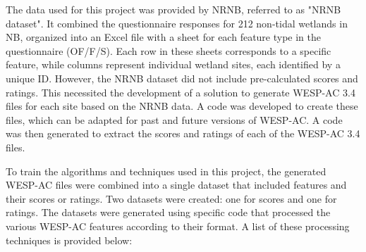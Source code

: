\documentclass[12pt,letterpaper]{article}
\begin{document}
The data used for this project was provided by \ac{NRNB}, referred to as "NRNB dataset".
It combined the questionnaire responses for 212 non-tidal wetlands in \ac{NB}, organized into an Excel file with a sheet for each feature type in the questionnaire (OF/F/S).
Each row in these sheets corresponds to a specific feature, while columns represent individual wetland sites, each identified by a unique ID.
However, the NRNB dataset did not include pre-calculated scores and ratings.
This necessited the development of a solution to generate \ac{WESP-AC} 3.4 files for each site based on the NRNB data.
A code was developed to create these files, which can be adapted for past and future versions of WESP-AC.
A code was then generated to extract the scores and ratings of each of the \ac{WESP-AC} 3.4 files.

To train the algorithms and techniques used in this project, the generated \ac{WESP-AC} files were combined into a single dataset that included features and their scores or ratings.
Two datasets were created: one for scores and one for ratings.
The datasets were generated using specific code that processed the various \ac{WESP-AC} features according to their format.
A list of these processing techniques is provided below:
\end{document}
